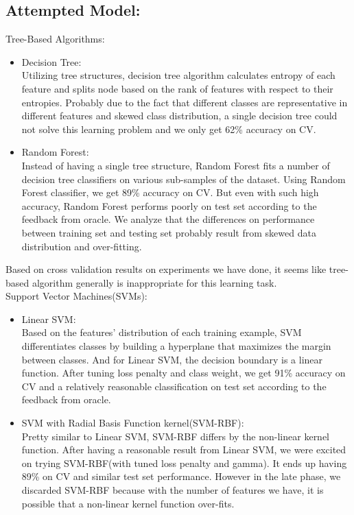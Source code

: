 \subsection{Attempted Model:}
Tree-Based Algorithms:
\begin{itemize}
	\item Decision Tree:\\
	Utilizing tree structures, decision tree algorithm calculates entropy of each feature and splits node based on the rank of features with respect to their entropies. Probably due to the fact that different classes are representative in different features and skewed class distribution, a single decision tree could not solve this learning problem and we only get 62\% accuracy on CV.\\
	\item Random Forest:\\
	Instead of having a single tree structure, Random Forest fits a number of decision tree classifiers on various sub-samples of the dataset.\cite{b7} Using Random Forest classifier, we get 89\% accuracy on CV. But even with such high accuracy, Random Forest performs poorly on test set according to the feedback from oracle. We analyze that the differences on performance between training set and testing set probably result from skewed data distribution and over-fitting. \\
\end{itemize}
\indent Based on cross validation results on experiments we have done, it seems like tree-based algorithm generally is inappropriate for this learning task. \newline\\
Support Vector Machines(SVMs):\\
\begin{itemize}
	\item Linear SVM:\\
	Based on the features' distribution of each training example, SVM differentiates classes by building a hyperplane that maximizes the margin between classes. And for Linear SVM, the decision boundary is a linear function. After tuning loss penalty and class weight, we get 91\% accuracy on CV and a relatively reasonable classification on test set according to the feedback from oracle.\\
	\item SVM with Radial Basis Function kernel(SVM-RBF):\\
	Pretty similar to Linear SVM, SVM-RBF differs by the non-linear kernel function. After having a reasonable result from Linear SVM, we were excited on trying SVM-RBF(with tuned loss penalty and gamma). It ends up having 89\% on CV and similar test set performance. However in the late phase, we discarded SVM-RBF because with the number of features we have, it is possible that a non-linear kernel function over-fits. \\
\end{itemize}

